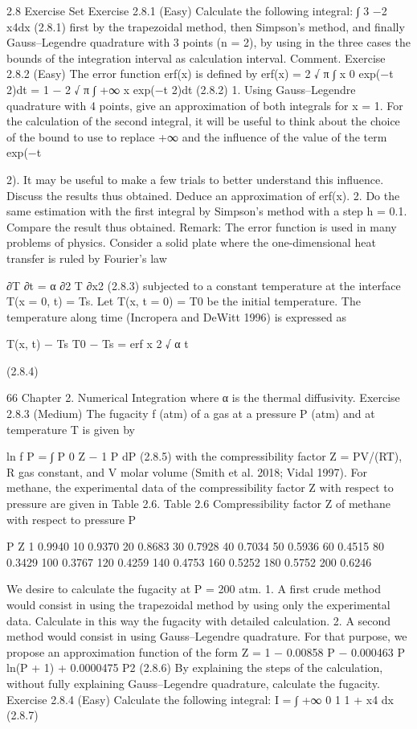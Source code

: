 \documentclass[letterpaper,12pt]{article}
\begin{document}
2.8 Exercise Set
Exercise 2.8.1 (Easy)
Calculate the following integral:
∫ 3
−2
x4dx (2.8.1)
first by the trapezoidal method, then Simpson’s method, and finally Gauss–Legendre
quadrature with 3 points (n = 2), by using in the three cases the bounds of the
integration interval as calculation interval. Comment.
Exercise 2.8.2 (Easy)
The error function erf(x) is defined by
erf(x) = 2
√
π
∫ x
0
exp(−t
2)dt = 1 − 2
√
π
∫ +∞
x
exp(−t
2)dt (2.8.2)
1. Using Gauss–Legendre quadrature with 4 points, give an approximation of both
integrals for x = 1. For the calculation of the second integral, it will be useful to
think about the choice of the bound to use to replace +∞ and the influence of the
value of the term exp(−t

2). It may be useful to make a few trials to better understand
this influence. Discuss the results thus obtained. Deduce an approximation of erf(x).
2. Do the same estimation with the first integral by Simpson’s method with a step
h = 0.1. Compare the result thus obtained.
Remark: The error function is used in many problems of physics. Consider a solid
plate where the one-dimensional heat transfer is ruled by Fourier’s law

∂T
∂t = α ∂2
T
∂x2 (2.8.3)
subjected to a constant temperature at the interface T(x = 0, t) = Ts. Let T(x, t = 0) =
T0 be the initial temperature. The temperature along time (Incropera and DeWitt 1996)
is expressed as

T(x, t) − Ts
T0 − Ts
= erf  x
2
√
α t


(2.8.4)

66 Chapter 2. Numerical Integration
where α is the thermal diffusivity.
Exercise 2.8.3 (Medium)
The fugacity f (atm) of a gas at a pressure P (atm) and at temperature T is given by

ln f
P =
∫ P
0
Z − 1
P
dP (2.8.5)
with the compressibility factor Z = PV/(RT), R gas constant, and V molar volume
(Smith et al. 2018; Vidal 1997).
For methane, the experimental data of the compressibility factor Z with respect to
pressure are given in Table 2.6.
Table 2.6 Compressibility factor Z of methane with respect to pressure P

P Z
1 0.9940
10 0.9370
20 0.8683
30 0.7928
40 0.7034
50 0.5936
60 0.4515
80 0.3429
100 0.3767
120 0.4259
140 0.4753
160 0.5252
180 0.5752
200 0.6246

We desire to calculate the fugacity at P = 200 atm.
1. A first crude method would consist in using the trapezoidal method by using only
the experimental data. Calculate in this way the fugacity with detailed calculation.
2. A second method would consist in using Gauss–Legendre quadrature. For that
purpose, we propose an approximation function of the form
Z = 1 − 0.00858 P − 0.000463 P ln(P + 1) + 0.0000475 P2 (2.8.6)
By explaining the steps of the calculation, without fully explaining Gauss–Legendre
quadrature, calculate the fugacity.
Exercise 2.8.4 (Easy)
Calculate the following integral:
I =
∫ +∞
0
1
1 + x4 dx (2.8.7)
\end{document}
